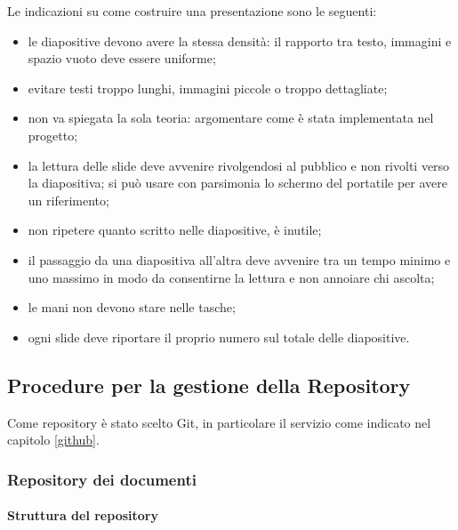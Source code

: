 \label{presentazione}
Le indicazioni su come costruire una presentazione sono le seguenti:
\begin{itemize}
	\item le diapositive devono avere la stessa densità: il rapporto tra testo, immagini e spazio vuoto deve essere uniforme;
	\item evitare testi troppo lunghi, immagini piccole o troppo dettagliate;
	\item non va spiegata la sola teoria: argomentare come è stata implementata nel progetto;
	\item la lettura delle slide deve avvenire rivolgendosi al pubblico e non rivolti verso la diapositiva; si può usare con parsimonia lo schermo del portatile per avere un riferimento;
	\item non ripetere quanto scritto nelle diapositive, è inutile;
	\item il passaggio da una diapositiva all'altra deve avvenire  tra un tempo minimo e uno massimo in modo da consentirne la lettura e non annoiare chi ascolta;
	\item le mani non devono stare nelle tasche;
	\item ogni slide deve riportare il proprio numero sul totale delle diapositive.
\end{itemize}






\subsection{Procedure per la gestione della Repository}

Come repository è stato scelto Git, in particolare il servizio  come indicato nel capitolo \ref{github}.

\subsubsection{Repository dei documenti}

\paragraph{Struttura del repository}


